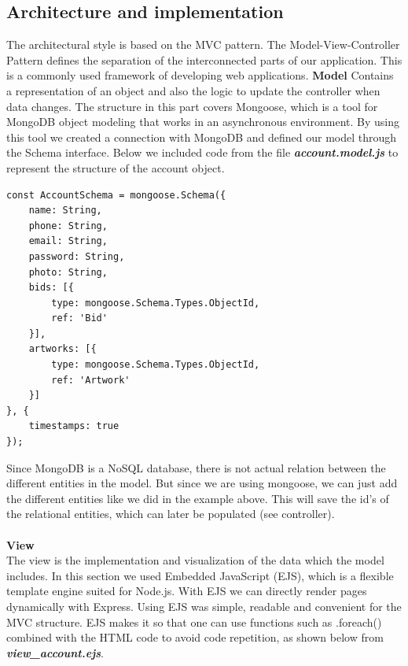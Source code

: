 \subsection{Architecture and implementation}
The architectural style is based on the MVC pattern. The Model-View-Controller Pattern defines the separation of the interconnected parts of our application. This is a commonly used framework of developing web applications. \cite{chrome:MVC}
\newline\newline
\textbf{Model}
\newline
Contains a representation of an object and also the logic to update the controller when data changes. The structure in this part covers Mongoose, which is a tool for MongoDB object modeling that works in an asynchronous environment. By using this tool we created a connection with MongoDB and defined our model through the Schema interface. Below we included code from the file \textbf{\textit{account.model.js}} to represent the structure of the account object.
\begin{verbatim}
const AccountSchema = mongoose.Schema({
    name: String,
    phone: String,
    email: String,
    password: String,
    photo: String,
    bids: [{
        type: mongoose.Schema.Types.ObjectId,
        ref: 'Bid'
    }],
    artworks: [{
        type: mongoose.Schema.Types.ObjectId,
        ref: 'Artwork'
    }]
}, {
    timestamps: true
});
\end{verbatim}
Since MongoDB is a NoSQL database, there is not actual relation between the different entities in the model. But since we are using mongoose, we can just add the different entities like we did in the example above. This will save the id's of the relational entities, which can later be populated (see controller).
\\\\
\textbf{View}
\\
The view is the implementation and visualization of the data which the model includes. In this section we used Embedded JavaScript (EJS), which is a flexible template engine suited for Node.js. With EJS we can directly render pages dynamically with Express. Using EJS was simple, readable and convenient for the MVC structure. EJS makes it so that one can use functions such as .foreach() combined with the HTML code to avoid code repetition, as shown below from \textbf{\textit{view\_account.ejs}}.

